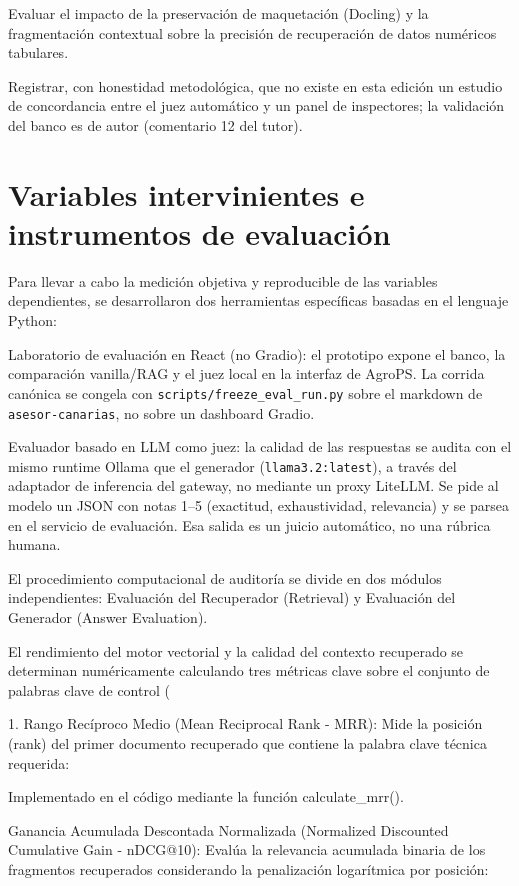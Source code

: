 Evaluar el impacto de la preservación de maquetación (Docling) y la fragmentación contextual sobre la precisión de recuperación de datos numéricos tabulares.

Registrar, con honestidad metodológica, que no existe en esta edición un estudio de concordancia entre el juez automático y un panel de inspectores; la validación del banco es de autor (comentario 12 del tutor).

\section{Variables intervinientes e instrumentos de evaluación}
Para llevar a cabo la medición objetiva y reproducible de las variables dependientes, se desarrollaron dos herramientas específicas basadas en el lenguaje Python:

Laboratorio de evaluación en React (no Gradio): el prototipo expone el banco, la comparación vanilla/RAG y el juez local en la interfaz de AgroPS. La corrida canónica se congela con \texttt{scripts/freeze\_eval\_run.py} sobre el markdown de \texttt{asesor-canarias}, no sobre un dashboard Gradio.

Evaluador basado en LLM como juez: la calidad de las respuestas se audita con el mismo runtime Ollama que el generador (\texttt{llama3.2:latest}), a través del adaptador de inferencia del gateway, no mediante un proxy LiteLLM. Se pide al modelo un JSON con notas 1--5 (exactitud, exhaustividad, relevancia) y se parsea en el servicio de evaluación. Esa salida es un juicio automático, no una rúbrica humana.

El procedimiento computacional de auditoría se divide en dos módulos independientes: Evaluación del Recuperador (Retrieval) y Evaluación del Generador (Answer Evaluation).

El rendimiento del motor vectorial y la calidad del contexto recuperado  se determinan numéricamente calculando tres métricas clave sobre el conjunto de palabras clave de control (

1. Rango Recíproco Medio (Mean Reciprocal Rank - MRR): Mide la posición (rank) del primer documento recuperado que contiene la palabra clave técnica requerida:

Implementado en el código mediante la función calculate\_mrr().

Ganancia Acumulada Descontada Normalizada (Normalized Discounted Cumulative Gain - nDCG@10): Evalúa la relevancia acumulada binaria de los fragmentos recuperados considerando la penalización logarítmica por posición:


